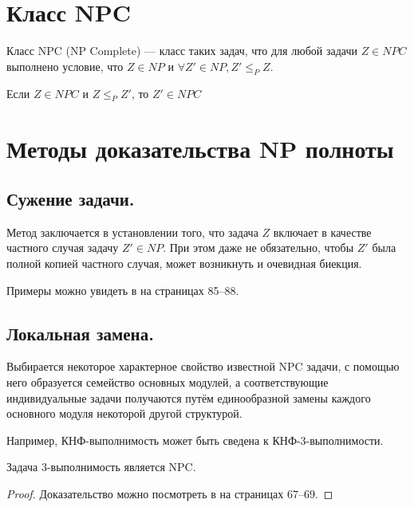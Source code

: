 \section{Класс NPC}
\begin{definition}
	Класс NPC (NP Complete) --- класс таких задач, что для любой задачи
	$Z\in NPC$ выполнено условие, что $Z\in NP$ и $\forall Z'\in NP, Z'
	\le_P Z$.
\end{definition}

\begin{lemma}
	Если $Z\in NPC$ и  $Z \le_P Z'$, то  $Z' \in NPC$
\end{lemma}



\section{Методы доказательства NP полноты}

\subsection*{Сужение задачи.}
Метод заключается в установлении того, что задача $Z$ включает в качестве частного случая задачу $Z' \in NP$. При этом даже не обязательно, чтобы $Z'$ была полной копией частного случая, может возникнуть и очевидная биекция. 

Примеры можно увидеть в \cite{Geri} на страницах 85--88.

\subsection*{Локальная замена.}

Выбирается некоторое характерное свойство известной NPC задачи, с помощью него образуется семейство основных модулей, а соответствующие индивидуальные задачи получаются путём единообразной замены каждого основного модуля некоторой другой структурой. 

Например, КНФ-выполнимость может быть сведена к КНФ-3-выполнимости.
\begin{theorem}
Задача 3-выполнимость является NPC.
\end{theorem}
\begin{proof}
Доказательство можно посмотреть в \cite{Geri} на страницах 67--69.
\end{proof}

